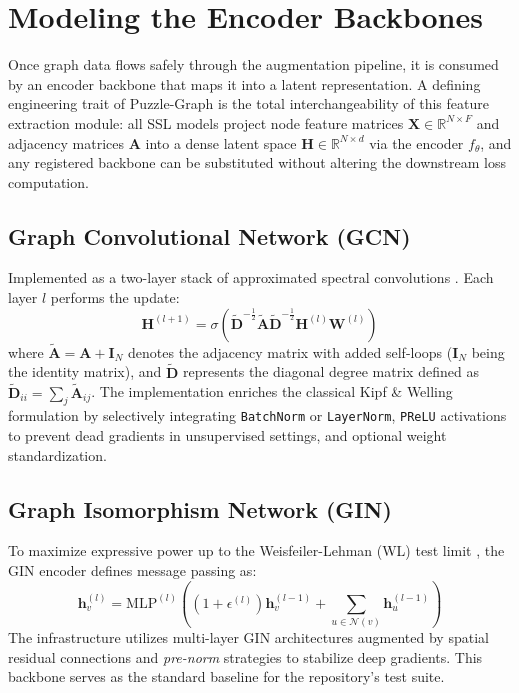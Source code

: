\documentclass[conference]{IEEEtran}
\begin{document}
\section{Modeling the Encoder Backbones}
Once graph data flows safely through the augmentation pipeline, it is consumed by an encoder backbone that maps it into a latent representation. A defining engineering trait of Puzzle-Graph is the total interchangeability of this feature extraction module: all SSL models project node feature matrices $\bm{X} \in \mathbb{R}^{N \times F}$ and adjacency matrices $\bm{A}$ into a dense latent space $\bm{H} \in \mathbb{R}^{N \times d}$ via the encoder $f_\theta$, and any registered backbone can be substituted without altering the downstream loss computation.

\subsection{Graph Convolutional Network (GCN)}
Implemented as a two-layer stack of approximated spectral convolutions \cite{gcn}. Each layer $l$ performs the update:
\begin{equation}
\bm{H}^{(l+1)} = \sigma\left( \tilde{\bm{D}}^{-\frac{1}{2}} \tilde{\bm{A}} \tilde{\bm{D}}^{-\frac{1}{2}} \bm{H}^{(l)} \bm{W}^{(l)} \right)
\end{equation}
where $\tilde{\bm{A}} = \bm{A} + \bm{I}_N$ denotes the adjacency matrix with added self-loops ($\bm{I}_N$ being the identity matrix), and $\tilde{\bm{D}}$ represents the diagonal degree matrix defined as $\tilde{\bm{D}}_{ii} = \sum_{j} \tilde{\bm{A}}_{ij}$. The implementation enriches the classical Kipf \& Welling formulation by selectively integrating \texttt{BatchNorm} or \texttt{LayerNorm}, \texttt{PReLU} activations to prevent dead gradients in unsupervised settings, and optional weight standardization.

\subsection{Graph Isomorphism Network (GIN)}
To maximize expressive power up to the Weisfeiler-Lehman (WL) test limit \cite{wl,gin}, the GIN encoder defines message passing as:
\begin{equation}
\bm{h}_v^{(l)} = \text{MLP}^{(l)} \left( (1 + \epsilon^{(l)}) \bm{h}_v^{(l-1)} + \sum_{u \in \mathcal{N}(v)} \bm{h}_u^{(l-1)} \right)
\end{equation}
The infrastructure utilizes multi-layer GIN architectures augmented by spatial residual connections and \textit{pre-norm} strategies to stabilize deep gradients. This backbone serves as the standard baseline for the repository's test suite.
\end{document}
